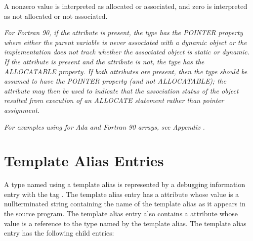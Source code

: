 A non\dash zero value is interpreted as allocated or associated,
and zero is interpreted as not allocated or not associated.

\textit{For Fortran 90, if the  attribute is present,
the type has the POINTER property where either the parent
variable is never associated with a dynamic object or the
implementation does not track whether the associated object
is static or dynamic. If the  attribute is
present and the  attribute is not, the type
has the ALLOCATABLE property. If both attributes are present,
then the type should be assumed to have the POINTER property
(and not ALLOCATABLE); the  attribute may then
be used to indicate that the association status of the object
resulted from execution of an ALLOCATE statement rather than
pointer assignment.}

\textit{For examples using  for Ada and Fortran 90
arrays, 
see Appendix .}



\section{Template Alias Entries}
\label{chap:templatealiasentries}

A type named using a template alias is represented
by a debugging information entry with the tag
. 
The template alias entry has a
 attribute whose value is a null\dash terminated string
containing the name of the template alias as it appears in
the source program. The template alias entry also contains a
 attribute whose value is a reference to the type
named by the template alias. The template alias entry has
the following child entries:

